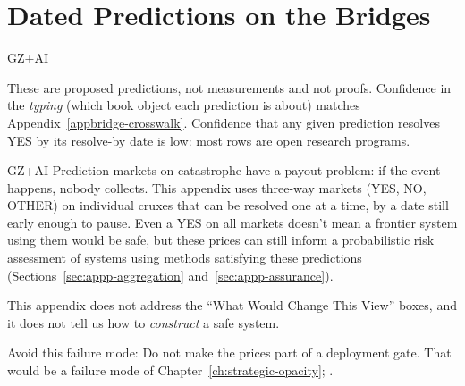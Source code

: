 \chapter{Dated Predictions on the Bridges}
\label{appp-bridge-predictions}

\begin{authbar}{GZ+AI}
\begin{epistemicstatus}
These are proposed predictions, not measurements and not proofs.
Confidence in the \emph{typing} (which book object each prediction is about) matches Appendix~\ref{appbridge-crosswalk}.
Confidence that any given prediction resolves YES by its resolve-by date is low:
most rows are open research programs.
\end{epistemicstatus}
\end{authbar}

\begin{authbar}{GZ+AI}
Prediction markets on catastrophe have a payout problem: if the event happens, nobody collects.
This appendix uses three-way markets (YES, NO, OTHER) on individual cruxes that can be resolved one at a time, by a date still early enough to pause.
Even a YES on all markets doesn't mean a frontier system using them would be safe,
but these prices can still inform a probabilistic risk assessment of systems using methods satisfying these predictions (Sections~\ref{sec:appp-aggregation} and~\ref{sec:appp-assurance}).

This appendix does not address the ``What Would Change This View'' boxes, and it does not tell us how to \emph{construct} a safe system.

Avoid this failure mode: Do not make the prices part of a deployment gate. That would be a failure mode of Chapter~\ref{ch:strategic-opacity}; \textcite{demski2019predictomatic}.

\end{authbar}
\authbarneedspace

